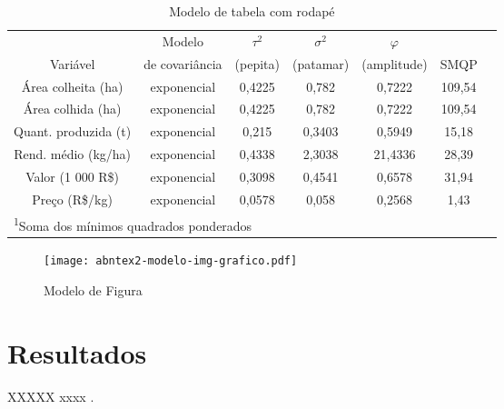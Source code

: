 \documentclass[
	12pt,				%
	openright,			%
	oneside,			%
	a4paper,			%
	english,			%
	french,				%
	spanish,			%
	brazil				%
	]{abntex2}
\begin{document}
\lipsum[15-16]

\begin{table}[htb]
	\centering
	\caption{Modelo de tabela com rodapé}
	\label{my-label}
	\begin{tabular}{ccccccc}  %
		\hline
		& Modelo  & $\tau^2$  & $\sigma^2$  & $\varphi$  &   \\
		Variável             &  de covariância &  (pepita) &  (patamar) &  (amplitude) &  SMQP \footnotemark[1] \\
		\hline
		Área colheita (ha)   & exponencial           & 0,4225   & 0,782     & 0,7222      & 109,54 \\
		Área colhida (ha)    & exponencial           & 0,4225   & 0,782     & 0,7222      & 109,54 \\
		Quant. produzida (t) & exponencial           & 0,215    & 0,3403    & 0,5949      & 15,18  \\
		Rend. médio (kg/ha)  & exponencial           & 0,4338   & 2,3038    & 21,4336     & 28,39  \\
		Valor (1 000 R\$)    & exponencial           & 0,3098   & 0,4541    & 0,6578      & 31,94  \\
		Preço (R\$/kg)       & exponencial           & 0,0578   & 0,058     & 0,2568      & 1,43   \\
		\hline
		\multicolumn{6}{l}{\textsuperscript{1}\footnotesize{Soma dos mínimos quadrados ponderados }}
		
	\end{tabular}
	
\end{table}

\lipsum[17-18]

\begin{figure}[htb]
	\caption{\label{fig_grafico} Modelo de Figura}
	\begin{center}
		\texttt{[image: abntex2-modelo-img-grafico.pdf]}
	\end{center}
\end{figure}

\chapter{Resultados}

\lipsum[19-20]


XXXXX \cite{halliday1982fisica} xxxx .
\end{document}
